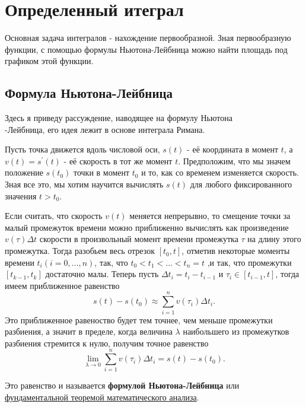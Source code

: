 \documentclass[a4paper,14pt]{article} %
\newcounter{counter_theorem}[section]
\newcounter{counter_lemma}[section]
\newcounter{counter_proof}[section]
\newcounter{counter_definition}[section]
\newcounter{counter_statement}[section]
\begin{document}
    
    \section{Определенный итеграл}
    \setcounter{equation}{0}
    
	Основная задача интегралов - нахождение первообразной. Зная первообразную функции, с помощью формулы Ньютона-Лейбница можно найти площадь под графиком этой функции.
	
	\subsection{Формула Ньютона-Лейбница}
	
	Здесь я приведу рассуждение, наводящее на формулу Ньютона\\-Лейбница, его идея лежит в основе интеграла Римана.
	
	\vspace{0.5cm}
	Пусть точка движется вдоль числовой оси, \( s(t) \) - её координата в момент \( t \), а \( v(t) = s^\prime{}(t) \) - её скорость в тот же момент \( t \). Предположим, что мы значем положение \( s(t_0) \) точки в момент \( t_0 \) и то, как со временем изменяется скорость. Зная все это, мы хотим научится вычислять \( s(t) \) для любого фиксированного значения \( t > t_0 \).
	
	Если считать, что скорость \( v(t) \) меняется непрерывно, то смещение точки за малый промежуток времени можно приближенно вычислять как произведение \( v(\tau)\Delta t \) скорости в произвольный момент времени промежутка \( \tau \) на длину этого промежутка. Тогда разобьем весь отрезок \( [t_0, t] \),  отметив некоторые моменты времени \( t_i (i = 0,\dots,n) \), так, что \( t_0 < t_1 < \dots < t_n = t \) ,и так, что промежутки \( [t_{k-1}, t_{k}] \) достаточно малы. Теперь пусть \( \Delta t_i = t_i - t_{i-1} \) и \( \tau_i \in [t_{i-1}, t] \), тогда имеем приближенное равенство 
	\[
	s(t) - s(t_0) \approx \sum_{i=1}^{n} {v(\tau_i)\Delta t_i}.
	\]
	Это приближенное равеноство будет тем точнее, чем меньше промежутки разбиения, а значит в пределе, когда величина \( \lambda \) наибольшего из промежутков разбиения стремится к нулю, получим точное равенство
	\begin{equation}\label{eq:FTC_physics}
	    \lim_{\lambda\to 0}{\sum_{i=1}^{n}{v(\tau_i)\Delta t_i} = s(t) - s(t_0)}.
	\end{equation}
	
	Это равенство и называется \textbf{формулой Ньютона-Лейбница} или \href{https://en.wikipedia.org/wiki/Fundamental_theorem_of_calculus}{фундаментальной теоремой математического анализа}. 
	
\end{document}
